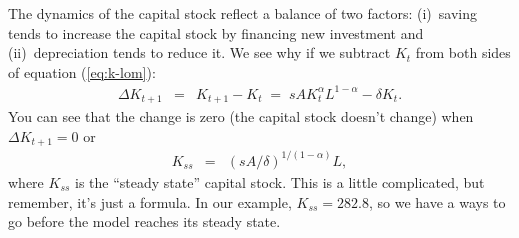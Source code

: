 \documentclass[letterpaper,12pt]{article}
\begin{document}
The dynamics of the capital stock reflect a balance of two factors:
(i)~saving tends to increase the capital stock by financing new investment
and (ii)~depreciation tends to reduce it.
We see why if we subtract $K_t$ from both sides of equation (\ref{eq:k-lom}):  
\begin{eqnarray}
    \Delta K_{t+1} &=& K_{t+1} - K_t
            \;=\;  s A K_t^\alpha L^{1-\alpha} - \delta K_t .
            \label{eq:dK}
\end{eqnarray}
You can see that the change is zero (the capital stock doesn't change)
when $ \Delta K_{t+1} = 0$ or
\begin{eqnarray}
    K_{ss} &=& \left( {s A}/{\delta} \right)^{1/(1-\alpha)} L ,
        \label{eq:Kss}
\end{eqnarray}
where $K_{ss}$ is the ``steady state'' capital stock.
This is a little complicated, but remember, it's just a formula.
In our example, $K_{ss} = 282.8$, so we have a ways to go before the model reaches its steady state.

\end{document}
